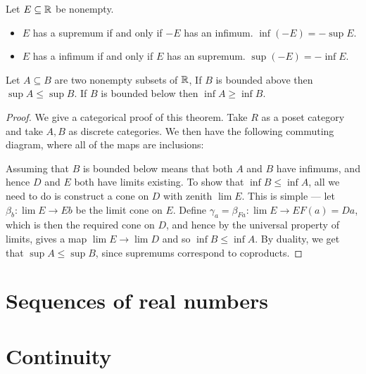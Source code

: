 \begin{theorem}
  Let \(E \subseteq \mathbb{R}\) be nonempty.
  \begin{itemize}
  \item \(E\) has a supremum if and only if \(-E\) has an infimum. \(\inf (-E) = - \sup E\).
  \item \(E\) has a infimum if and only if \(E\) has an supremum. \(\sup (-E) = - \inf E\).
  \end{itemize}
\end{theorem}

\begin{theorem}
  Let \(A \subseteq B\) are two nonempty subsets of \(\mathbb{R}\), If \(B\) is bounded above then \(\sup A \leq \sup B\). If \(B\) is bounded below then \(\inf A \geq \inf B\).
\end{theorem}

\begin{proof}
  We give a categorical proof of this theorem. Take \(R\) as a poset category and take \(A, B\) as discrete categories. We then have the following commuting diagram, where all of the maps are inclusions:
  \begin{centre}
  \end{centre}

  Assuming that \(B\) is bounded below means that both \(A\) and \(B\) have infimums, and hence \(D\) and \(E\) both have limits existing. To show that \(\inf B \leq \inf A\), all we need to do is construct a cone on \(D\) with zenith \(\lim{}{E}\). This is simple --- let \(\beta_{b} : \lim{}{E} \rightarrow E b\) be the limit cone on \(E\). Define \(\gamma_{a} = \beta_{Fa}: \lim{}{E} \rightarrow EF (a) = D a\), which is then the required cone on \(D\), and hence by the universal property of limits, gives a map \(\lim{}{E} \rightarrow \lim{}{D}\) and so \(\inf B \leq \inf A\). By duality, we get that \(\sup A \leq \sup B\), since supremums correspond to coproducts.
\end{proof}

\section{Sequences of real numbers}

\section{Continuity}

